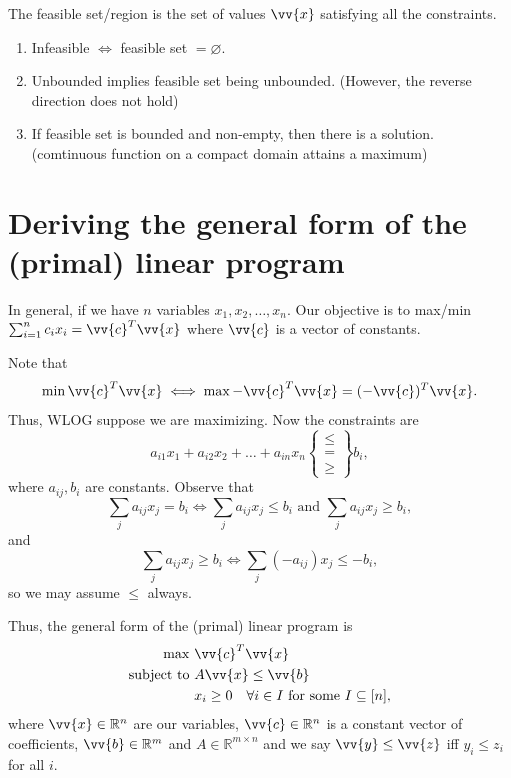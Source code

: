 \begin{definition}
    The feasible set/region is the set of values \(\vv{x}\) satisfying all the constraints. 
\end{definition}

\begin{remark}
    \quad 
    \begin{enumerate}
        \item Infeasible \(\iff \) feasible set \(= \varnothing\). 
        \item Unbounded implies feasible set being unbounded. (However, the reverse direction does not hold) 
        \item If feasible set is bounded and non-empty, then there is a solution. (comtinuous function on a compact domain attains a maximum)  
    \end{enumerate}
\end{remark}

\section{Deriving the general form of the (primal) linear program}

In general, if we have \(n\) variables \(x_1, x_2, \dots , x_n\). Our objective is to max/min \(\sum_{i=1}^n c_i x_i =  \vv{c}^T \vv{x} \) where \(\vv{c}\) is a vector of constants. 

Note that 
\[
    \min \vv{c}^T \vv{x} \iff \max - \vv{c}^T \vv{x} = (- \vv{c})^T \vv{x}.
\]
Thus, WLOG suppose we are maximizing. Now the constraints are  
\[
    a_{i1} x_1 + a_{i2} x_2 + \dots + a_{in} x_n \begin{Bmatrix}
        \le \\ = \\ \ge
    \end{Bmatrix} b_i,
\]
where \(a_{ij}, b_i\) are constants. Observe that 
\[
    \sum_{j} a_{ij} x_j = b_i \iff \sum_{j} a_{ij} x_j \le b_i \text{ and } \sum_{j} a_{ij} x_j \ge b_i,   
\]
and 
\[
    \sum_{j} a_{ij} x_j \ge b_i \iff \sum_{j} (-a_{ij}) x_j \le -b_i, 
\]
so we may assume \(\le\) always. 

Thus, the general form of the (primal) linear program is 
\[
    \begin{aligned}
        \max~ & \vv{c}^T \vv{x}  \\
           \text{subject to }  & A \vv{x} \le \vv{b}  \\
            & x_i \ge 0 \quad \forall i \in I \text{ for some } I \subseteq [n], 
    \end{aligned}
\]
where \(\vv{x} \in \mathbb{R} ^n\) are our variables, \(\vv{c} \in \mathbb{R} ^n\) is a constant vector of coefficients, \(\vv{b} \in \mathbb{R} ^m\) and \(A \in \mathbb{R} ^{m \times n}\) and we say \(\vv{y} \le \vv{z}\) iff \(y_i \le z_i\) for all \(i\).

